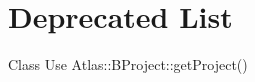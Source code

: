 \chapter{Deprecated List}
\hypertarget{deprecated}{}\label{deprecated}

\begin{DoxyRefList}
\item[Class \doxylink{class_atlas_1_1_b_project_1_1_project_reference}{Atlas\+::BProject\+::Project\+Reference} ]\label{deprecated__deprecated000001}%
%
Use Atlas\+::\+BProject\+::get\+Project()
\end{DoxyRefList}